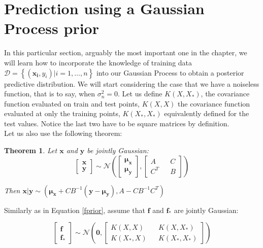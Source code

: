 \documentclass[10pt,a4paper,twoside]{book}
\newtheorem{mydef}{Theorem}
\begin{document}
\section{Prediction using a Gaussian Process prior}
\label{pred}

In this particular section, arguably the most important one in the chapter, we will learn how to incorporate the knowledge of training data $\mathcal{D} = \left\lbrace \left(\boldsymbol{x_i}, y_i\right) | i = 1,\dots,n\right\rbrace$ into our Gaussian Process to obtain a posterior predictive distribution. We will start considering the case that we have a noiseless function, that is to say, when $\sigma^2_n = 0$. Let us define $K(X, X_{*})$, the covariance function evaluated on train and test points, $K(X, X)$ the covariance function evaluated at only the training points, $K(X_{*}, X_{*})$ equivalently defined for the test values. Notice the last two have to be square matrices by definition.\\

Let us also use the following theorem:

\begin{mydef}
\label{conditioning}
Let $\boldsymbol{x}$ and $\boldsymbol{y}$ be jointly Gaussian:
\begin{equation}
\begin{bmatrix}
\boldsymbol{x}\\
\boldsymbol{y}
\end{bmatrix} \sim \mathcal{N}\left(
\begin{bmatrix}
\boldsymbol{\mu_x}\\
\boldsymbol{\mu_y}
\end{bmatrix},
\begin{bmatrix}
A   && C \\
C^T && B
\end{bmatrix}
\right)
\end{equation}

Then $\boldsymbol{x|y} \sim \left(\boldsymbol{\mu_x} + C B^{-1}(\boldsymbol{y} - \boldsymbol{\mu_y}), A - CB^{-1}C^T \right)$
\end{mydef}

Similarly as in Equation \ref{fprior}, assume that $\boldsymbol{f}$ and $\boldsymbol{f_*}$ are jointly Gaussian:

\begin{equation}
\begin{bmatrix}
\boldsymbol{f}\\
\boldsymbol{f_*}
\end{bmatrix} \sim \mathcal{N}\left(
\boldsymbol{0},
\begin{bmatrix}
K(X, X)  && K(X, X_*) \\
K(X_*, X) && K(X_*, X_*)
\end{bmatrix}
\right)
\end{equation}
\end{document}
